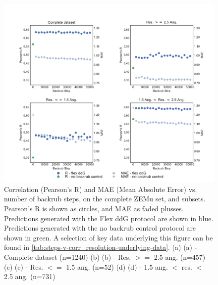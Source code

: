 \begin{figure}
  \includegraphics[width=\textwidth,keepaspectratio]{steps-v-corr_resolution.pdf}
  \caption[Flex ddG performance vs. number of backrub steps]{
    Correlation (Pearson's R) and MAE (Mean Absolute Error) vs. number of backrub steps, on the complete ZEMu set, and subsets.
    Pearson's R is shown as circles, and MAE as faded plusses.
Predictions generated with the Flex ddG protocol are shown in blue.
Predictions generated with the no backrub control protocol are shown in green.
    A selection of key data underlying this figure can be found in \cref{tab:steps-v-corr_resolution-underlying-data}.
    (a) (a) - Complete dataset (n=1240)
    (b) (b) - Res. $>=$ 2.5 ang. (n=457)
    (c) (c) - Res. $<=$ 1.5 ang. (n=52)
    (d) (d) - 1.5 ang. $<$ res. $<$ 2.5 ang. (n=731)
  } \label{fig:steps-v-corr_resolution}
\end{figure}
